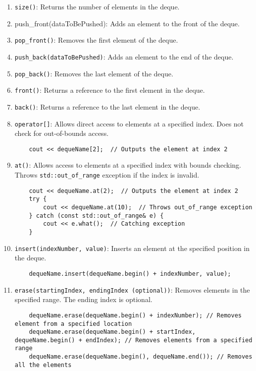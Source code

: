 \documentclass{article}
\begin{document}
\begin{enumerate}
    \item \texttt{size()}: Returns the number of elements in the deque.
    \item push\_front(dataToBePushed): Adds an element to the front of the deque.
    \item \texttt{pop\_front()}: Removes the first element of the deque.
    \item \texttt{push\_back(dataToBePushed)}: Adds an element to the end of the deque.
    \item \texttt{pop\_back()}: Removes the last element of the deque.
    \item \texttt{front()}: Returns a reference to the first element in the deque.
    \item \texttt{back()}: Returns a reference to the last element in the deque.
    \item \texttt{operator[]}: Allows direct access to elements at a specified index. Does not check for out-of-bounds access.
    \begin{lstlisting}
    cout << dequeName[2];  // Outputs the element at index 2
    \end{lstlisting}
    \item \texttt{at()}: Allows access to elements at a specified index with bounds checking. Throws \texttt{std::out\_of\_range} exception if the index is invalid.
    \begin{lstlisting}
    cout << dequeName.at(2);  // Outputs the element at index 2
    try {
        cout << dequeName.at(10);  // Throws out_of_range exception
    } catch (const std::out_of_range& e) {
        cout << e.what();  // Catching exception
    }
    \end{lstlisting}
    \item \texttt{insert(indexNumber, value)}: Inserts an element at the specified position in the deque.
    \begin{lstlisting}
    dequeName.insert(dequeName.begin() + indexNumber, value);
    \end{lstlisting}
    \item \texttt{erase(startingIndex, endingIndex (optional))}: Removes elements in the specified range. The ending index is optional.
    \begin{lstlisting}
    dequeName.erase(dequeName.begin() + indexNumber); // Removes element from a specified location
    dequeName.erase(dequeName.begin() + startIndex, dequeName.begin() + endIndex); // Removes elements from a specified range
    dequeName.erase(dequeName.begin(), dequeName.end()); // Removes all the elements
    \end{lstlisting}
    

\end{enumerate}
\end{document}
